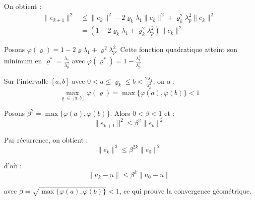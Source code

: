 {\begin{enumerate}
{On obtient :
$$\begin{aligned}
\|e_{k+1}\|^2 &\leq \|e_k\|^2 - 2\varrho_k \lambda_1 \|e_k\|^2 + \varrho_k^2 \lambda_p^2 \|e_k\|^2\\
&= (1 - 2\varrho_k \lambda_1 + \varrho_k^2 \lambda_p^2)\|e_k\|^2
\end{aligned}$$

Posons $\varphi(\varrho) = 1 - 2\varrho \lambda_1 + \varrho^2 \lambda_p^2$. Cette fonction quadratique atteint son minimum en $\varrho^* = \frac{\lambda_1}{\lambda_p^2}$ avec $\varphi(\varrho^*) = 1 - \frac{\lambda_1^2}{\lambda_p^2}$.

Sur l'intervalle $[a,b]$ avec $0 < a \leq \varrho_k \leq b < \frac{2\lambda_1}{\lambda_p^2}$, on a :
$$\max_{\varrho \in [a,b]} \varphi(\varrho) = \max\{\varphi(a), \varphi(b)\} < 1$$

Posons $\beta^2 = \max\{\varphi(a), \varphi(b)\}$. Alors $0 < \beta < 1$ et :
$$\|e_{k+1}\|^2 \leq \beta^2 \|e_k\|^2$$

Par récurrence, on obtient :
$$\|e_k\|^2 \leq \beta^{2k} \|e_0\|^2$$

d'où :
$$\boxed{\|u_k - u\| \leq \beta^k \|u_0 - u\|}$$

avec $\beta = \sqrt{\max\{\varphi(a), \varphi(b)\}} < 1$, ce qui prouve la convergence géométrique.

}
\end{enumerate}

}

















